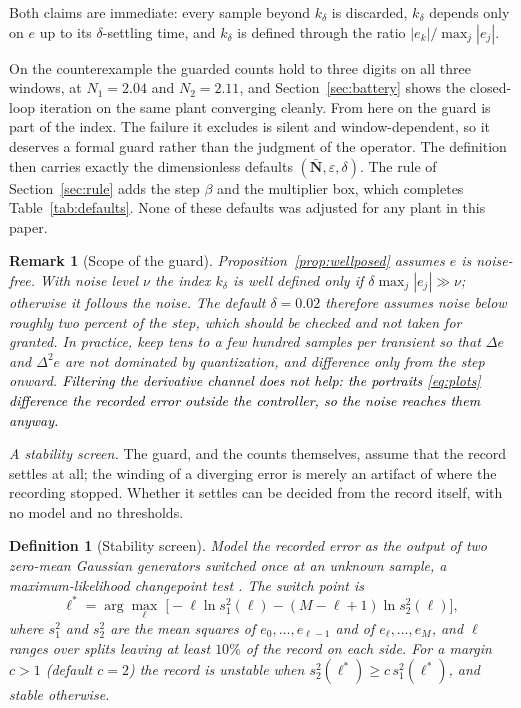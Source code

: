 \documentclass[final,3p,times,twocolumn]{elsarticle}
\newcommand{\rev}[1]{#1}   %
\newcommand{\fix}[1]{#1}  %
\newcommand{\new}[1]{\textcolor{black}{#1}}  %
\newtheorem{remark}{Remark}
\newtheorem{definition}{Definition}
\begin{document}
\fix{Both claims are immediate: every sample beyond $k_\delta$ is
discarded, $k_\delta$ depends only on $e$ up to its $\delta$-settling
time, and $k_\delta$ is defined through the ratio
$|e_k|/\max_j|e_j|$.}

On the counterexample the guarded counts hold to three digits on all
three windows, at $N_1 = 2.04$ and $N_2 = 2.11$, and
Section~\ref{sec:battery} shows the closed-loop iteration on the same
plant converging cleanly. From here on the guard is part of the index. The failure it excludes is
silent and window-dependent, so it deserves a formal guard rather than
the judgment of the operator. The definition then carries exactly the
dimensionless defaults $(\bar{\mathbf N}, \varepsilon, \delta)$. The rule of
Section~\ref{sec:rule} adds the step $\beta$ and the multiplier box,
which completes Table~\ref{tab:defaults}. None of these defaults was
adjusted for any plant in this paper.

\begin{remark}[Scope of the guard]\label{rem:noise}
Proposition~\ref{prop:wellposed} assumes $e$ is noise-free. With noise
level $\nu$ the index $k_\delta$ is well defined only if
$\delta \max_j |e_j| \gg \nu$; otherwise it follows the noise.
The default $\delta = 0.02$ therefore assumes noise below roughly two
percent of the step, which should be checked and not taken for granted.
In practice, keep tens to a few hundred samples per transient so that
$\Delta e$ and $\Delta^2 e$ are not dominated by quantization, and
difference only from the step onward. \new{Filtering the derivative
channel does not help: the portraits \eqref{eq:plots} difference the
recorded error outside the controller, so the noise reaches them
anyway.}
\end{remark}

\emph{A stability screen.} The guard, and the counts themselves, assume
that the record settles at all; the winding of a diverging error is
merely an artifact of where the recording stopped. Whether it settles
can be decided from the record itself, with no model and no
thresholds.

\begin{definition}[Stability screen]\label{def:screen}
Model the recorded error as the output of two zero-mean Gaussian
generators switched once at an unknown sample, a maximum-likelihood
changepoint test \cite{BassevilleNikiforov1993}. The switch point is
\begin{equation}
\ell^\ast = \arg\max_{\ell}\;
\bigl[-\ell \ln s_1^2(\ell) - \rev{(M{-}\ell{+}1)}\ln s_2^2(\ell)\bigr],
\end{equation}
where $s_1^2$ and $s_2^2$ are the mean squares of $e_0,\dots,e_{\ell-1}$
and of $e_\ell,\dots,e_M$, and $\ell$ ranges over splits leaving at
least $10\%$ of the record on each side. \fix{For a
margin $c > 1$ (default $c = 2$)} the record is \emph{unstable} when
$s_2^2(\ell^\ast) \ge \fix{c\,}s_1^2(\ell^\ast)$, and \emph{stable}
otherwise.
\end{definition}
\end{document}
